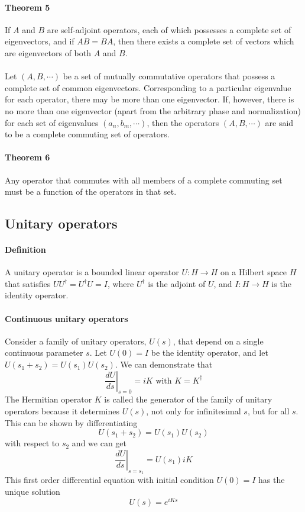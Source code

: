 \documentclass{article}
\begin{document}
\paragraph{Theorem 5} If $A$ and $B$ are self-adjoint operators, each of which possesses a complete set of eigenvectors, and if $AB =BA$, then there exists a complete set of vectors which are eigenvectors of both $A$ and $B$.\\ \\
Let $(A, B, \cdots)$ be a set of mutually commutative operators that possess a complete set of common eigenvectors. Corresponding to a particular eigenvalue for each operator, there may be more than one eigenvector. If, however, there is no more than one eigenvector (apart from the arbitrary phase and normalization) for each set of eigenvalues $(a_n, b_m, \cdots)$, then the operators $(A, B, \cdots)$ are said to be a complete commuting set of operators.
\paragraph{Theorem 6} Any operator that commutes with all members of a complete commuting set must be a function of the operators in that set.

\subsection{Unitary operators}
\paragraph{Definition} A unitary operator is a bounded linear operator $U: H\to H$ on a Hilbert space $H$ that satisfies $UU^{\dagger} = U^{\dagger}U =I$, where $U^{\dagger}$ is the adjoint of $U$, and $I: H \to H$ is the identity operator.
\paragraph{Continuous unitary operators} Consider a family of unitary operators, $U(s)$, that depend on a single continuous parameter $s$. 
Let $U(0) = I $ be the identity operator, and let $U(s_1+s_2) = U(s_1)U(s_2)$.
We can demonstrate that
\[\left. \frac{dU}{ds}\right|_{s=0} = iK \mbox{ with } K = K^{\dagger}\]
The Hermitian operator $K$ is called the generator of the family of unitary operators because it determines $U(s)$, not only for infinitesimal $s$, but for all $s$. This can be shown by differentiating
\[U(s_1+s_2) = U(s_1)U(s_2)\]
with respect to $s_2$ and we can get
\[\left. \frac{dU}{ds}\right|_{s=s_1} = U(s_1)iK \]
This first order differential equation with initial condition $U(0) = I$ has the unique solution
\[U(s) = e^{iKs}\]
\end{document}
